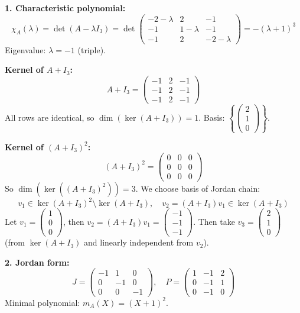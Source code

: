 \documentclass[12pt]{article}
\begin{document}
\begin{correctionbox}
\textbf{1. Characteristic polynomial:}
\[
\chi_A(\lambda) = \det(A - \lambda I_3) = \det\begin{pmatrix}
-2-\lambda & 2 & -1 \\
-1 & 1-\lambda & -1 \\
-1 & 2 & -2-\lambda
\end{pmatrix} = -(\lambda+1)^3
\]
Eigenvalue: $\lambda = -1$ (triple).

\textbf{Kernel of $A + I_3$:}
\[
A + I_3 = \begin{pmatrix} -1 & 2 & -1 \\ -1 & 2 & -1 \\ -1 & 2 & -1 \end{pmatrix}
\]
All rows are identical, so $\dim(\ker(A+I_3)) = 1$. Basis: $\left\{\begin{pmatrix} 2 \\ 1 \\ 0 \end{pmatrix}\right\}$.

\textbf{Kernel of $(A + I_3)^2$:}
\[
(A + I_3)^2 = \begin{pmatrix} 0 & 0 & 0 \\ 0 & 0 & 0 \\ 0 & 0 & 0 \end{pmatrix}
\]
So $\dim(\ker((A+I_3)^2)) = 3$. We choose basis of Jordan chain:
\[
v_1 \in \ker(A+I_3)^2 \setminus \ker(A+I_3), \quad v_2 = (A+I_3)v_1 \in \ker(A+I_3)
\]
Let $v_1 = \begin{pmatrix} 1 \\ 0 \\ 0 \end{pmatrix}$, then $v_2 = (A+I_3)v_1 = \begin{pmatrix} -1 \\ -1 \\ -1 \end{pmatrix}$.
Then take $v_3 = \begin{pmatrix} 2 \\ 1 \\ 0 \end{pmatrix}$ (from $\ker(A+I_3)$ and linearly independent from $v_2$).

\textbf{2. Jordan form:}
\[
J = \begin{pmatrix} -1 & 1 & 0 \\ 0 & -1 & 0 \\ 0 & 0 & -1 \end{pmatrix}, \quad P = \begin{pmatrix} 1 & -1 & 2 \\ 0 & -1 & 1 \\ 0 & -1 & 0 \end{pmatrix}
\]
Minimal polynomial: $m_A(X) = (X+1)^2$.


\end{correctionbox}
\end{document}
